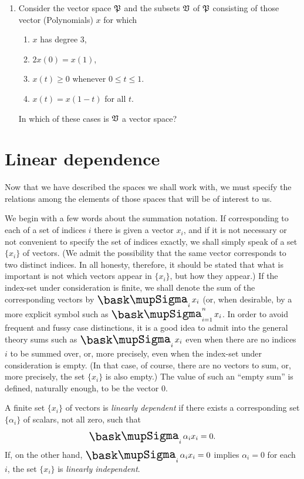 {\begin{enumerate}[wide]
    \item Consider the vector space \(\mathfrak{P}\) and the subsets \(\mathfrak{V}\) of \(\mathfrak{P}\) consisting of those vector (Polynomials) \(x\) for which
    \begin{enumerate}[wide, label=(\alph*), nosep]
        \item \(x\) has degree \(3\),
        \item \(2x(0) = x(1)\),
        \item \(x(t) \geq 0\) whenever \(0 \leq t \leq 1\).
        \item \(x(t) = x(1-t)\) for all \(t\).
    \end{enumerate}
    In which of these cases is \(\mathfrak{V}\) a vector space?
\end{enumerate}
}

\section{Linear dependence}\label{sec-linear-dependence}

Now that we have described the spaces we shall work with, we must specify the
relations among the elements of those spaces that will be of interest to us.

We begin with a few words about the summation notation. If corresponding to each
of a set of indices \(i\) there is given a vector \(x_i\), and if it is not
necessary or not convenient to specify the set of indices exactly, we shall
simply speak of a set \(\{x_i\}\) of vectors. (We admit the possibility that the
same vector corresponds to two distinct indices. In all honesty, therefore, it
should be stated that what is important is not which vectors appear in
\(\{x_i\}\), but how they appear.) If the index-set under consideration is
finite, we shall denote the sum of the corresponding vectors by \(\sumx_i x_i\)
(or, when desirable, by a more explicit symbol such as \(\sumx_{i=1}^n x_i\). In
order to avoid frequent and fussy case distinctions, it is a good idea to admit
into the general theory sums such as \(\sumx_i x_i\) even when there are no
indices \(i\) to be summed over, or, more precisely, even when the index-set
under consideration is empty. (In that case, of course, there are no vectors to
sum, or, more precisely, the set \(\{x_i\}\) is also empty.) The value of such
an ``empty sum'' is defined, naturally enough, to be the vector 0.

\begin{definition}
    A finite set \(\{x_i\}\) of vectors is \emph{linearly dependent} if there
    exists a corresponding set \(\{\alpha_i\}\) of scalars, not all zero, such
    that
    \begin{equation*}
        \textstyle\sumx_i \alpha_i x_i = 0.
    \end{equation*}
    If, on the other hand, \(\sumx_i \alpha_i x_i = 0\) implies \(\alpha_i = 0\)
    for each \(i\), the set \(\{x_i\}\) is \emph{linearly independent}.
\end{definition}

